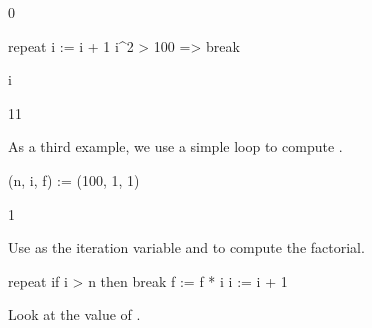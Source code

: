 {\begin{xtc}
\begin{TeXOutput}
\begin{fricasmath}{4}
0%
\end{fricasmath}
\end{TeXOutput}
\end{xtc}
\begin{xtc}
\begin{xtccomment}
\end{xtccomment}
\begin{spadsrc}
repeat
  i := i + 1
  i^2 > 100 => break
\end{spadsrc}
\end{xtc}
\begin{xtc}
\begin{xtccomment}
\end{xtccomment}
\begin{spadsrc}
i 
\end{spadsrc}
\begin{TeXOutput}
\begin{fricasmath}{6}
11%
\end{fricasmath}
\end{TeXOutput}
\end{xtc}
%
%
\begin{xtc}
\begin{xtccomment}
As a third example, we use a simple loop to compute .
\end{xtccomment}
\begin{spadsrc}
(n, i, f) := (100, 1, 1) 
\end{spadsrc}
\begin{TeXOutput}
\begin{fricasmath}{7}
1%
\end{fricasmath}
\end{TeXOutput}
\end{xtc}
\begin{xtc}
\begin{xtccomment}
Use  as the iteration variable and 
to compute the factorial.
\end{xtccomment}
\begin{spadsrc}
repeat
  if i > n then break
  f := f * i
  i := i + 1
\end{spadsrc}
\end{xtc}
\begin{xtc}
\begin{xtccomment}
Look at the value of .
\end{xtccomment}
\begin{spadsrc}

\end{spadsrc}
\end{xtc}}

